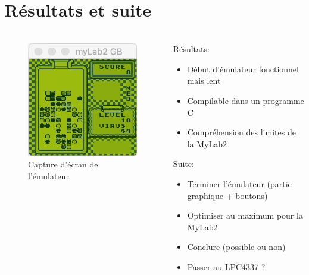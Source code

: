 \documentclass{beamer}
\begin{document}
\section{Résultats et suite}
\begin{frame}
	\frametitle{\secname}
  \begin{columns}[T]
		\begin{column}{.40\textwidth}
			\begin{figure}
				\includegraphics[width=.75\textwidth]{images/screenshot.png}
				\caption{Capture d'écran de l'émulateur}
			\end{figure}
		\end{column}
		\begin{column}{.70\textwidth}
      Résultats:
      \begin{itemize}
        \item Début d'émulateur fonctionnel mais lent
        \item Compilable dans un programme C
        \item Compréhension des limites de la MyLab2
      \end{itemize}
      Suite:
      \begin{itemize}
        \item Terminer l'émulateur (partie graphique + boutons)
        \item Optimiser au maximum pour la MyLab2
        \item Conclure (possible ou non)
        \item Passer au LPC4337 ?
      \end{itemize}
		\end{column}
	\end{columns}
\end{frame}
\end{document}
